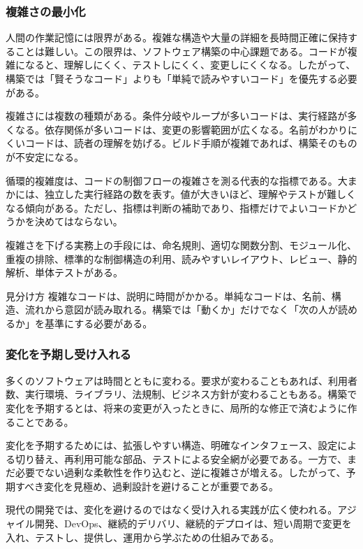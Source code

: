 \documentclass[a4paper,11pt]{ltjsarticle}
\numberwithin{figure}{section}
\numberwithin{table}{section}
\begin{document}
\subsubsection{複雑さの最小化}

人間の作業記憶には限界がある。複雑な構造や大量の詳細を長時間正確に保持することは難しい。この限界は、ソフトウェア構築の中心課題である。コードが複雑になると、理解しにくく、テストしにくく、変更しにくくなる。したがって、構築では「賢そうなコード」よりも「単純で読みやすいコード」を優先する必要がある。

複雑さには複数の種類がある。条件分岐やループが多いコードは、実行経路が多くなる。依存関係が多いコードは、変更の影響範囲が広くなる。名前がわかりにくいコードは、読者の理解を妨げる。ビルド手順が複雑であれば、構築そのものが不安定になる。

循環的複雑度は、コードの制御フローの複雑さを測る代表的な指標である。大まかには、独立した実行経路の数を表す。値が大きいほど、理解やテストが難しくなる傾向がある。ただし、指標は判断の補助であり、指標だけでよいコードかどうかを決めてはならない。

複雑さを下げる実務上の手段には、命名規則、適切な関数分割、モジュール化、重複の排除、標準的な制御構造の利用、読みやすいレイアウト、レビュー、静的解析、単体テストがある。

\begin{keybox}{見分け方}
複雑なコードは、説明に時間がかかる。単純なコードは、名前、構造、流れから意図が読み取れる。構築では「動くか」だけでなく「次の人が読めるか」を基準にする必要がある。
\end{keybox}

\subsubsection{変化を予期し受け入れる}

多くのソフトウェアは時間とともに変わる。要求が変わることもあれば、利用者数、実行環境、ライブラリ、法規制、ビジネス方針が変わることもある。構築で変化を予期するとは、将来の変更が入ったときに、局所的な修正で済むように作ることである。

変化を予期するためには、拡張しやすい構造、明確なインタフェース、設定による切り替え、再利用可能な部品、テストによる安全網が必要である。一方で、まだ必要でない過剰な柔軟性を作り込むと、逆に複雑さが増える。したがって、予期すべき変化を見極め、過剰設計を避けることが重要である。

現代の開発では、変化を避けるのではなく受け入れる実践が広く使われる。アジャイル開発、DevOps、継続的デリバリ、継続的デプロイは、短い周期で変更を入れ、テストし、提供し、運用から学ぶための仕組みである。
\end{document}
